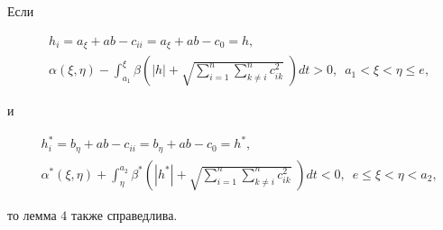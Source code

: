\begin{cor}


Если


\begin{equation}\label{z2}


\begin{split}


& h_i=a_{\xi}+ab-c_{ii}=a_{\xi}+ab-c_0=h,\\


& \alpha (\xi,\eta)-


\int_{a_1}^{\xi }\beta\left(|h|+\sqrt{\sum_{i=1}^n\sum_{k\neq i}^n


c_{ik}^2}\;\right) dt>0,\ \; a_1<\xi <\eta \le e,


\end{split}


\end{equation}


и


\begin{equation}\label{z2*}


\begin{split}


&h^*_i=b_{\eta}+ab-c_{ii}=b_{\eta}+ab-c_0=h^*,\\


&\alpha^* (\xi,\eta)+


\int_{\eta}^{a_2}\beta^*\left(|h^*|+\sqrt{\sum_{i=1}^n\sum_{k\neq i}^n


c_{ik}^2}\;\right) dt<0,\ \; e\le\xi <\eta < a_2,


\end{split}


\end{equation}


то лемма $4$ также справедлива.


\end{cor}






